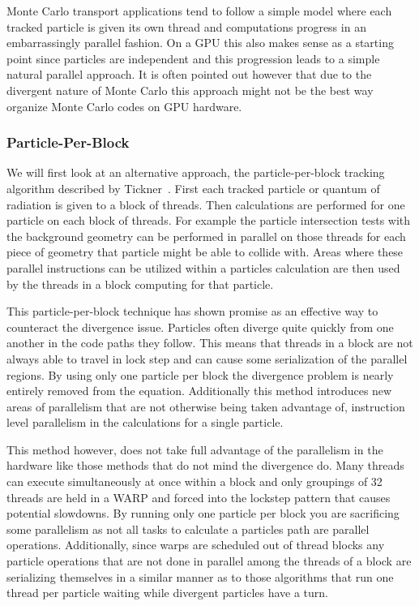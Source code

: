 %
Monte Carlo transport applications tend to follow a simple model where each tracked particle is given its own thread and computations progress in an embarrassingly parallel fashion. 
%
On a GPU this also makes sense as a starting point since particles are independent and this progression leads to a simple natural parallel approach.
%
It is often pointed out however that due to the divergent nature of Monte Carlo this approach might not be the best way organize Monte Carlo codes on GPU hardware.
%

\subsubsection*{\textbf{Particle-Per-Block}}
We will first look at an alternative approach, the particle-per-block tracking algorithm described by Tickner~\cite{tickner2010monte}.
%
First each tracked particle or quantum of radiation is given to a block of threads.
%
Then calculations are performed for one particle on each block of threads.
%
For example the particle intersection tests with the background geometry can be performed in parallel on those threads for each piece of geometry that particle might be able to collide with.
%
Areas where these parallel instructions can be utilized within a particles calculation are then used by the threads in a block computing for that particle.
%

This particle-per-block technique has shown promise as an effective way to counteract the divergence issue.
%
Particles often diverge quite quickly from one another in the code paths they follow.
%
This means that threads in a block are not always able to travel in lock step and can cause some serialization of the parallel regions.
%
By using only one particle per block the divergence problem is nearly entirely removed from the equation.
%
Additionally this method introduces new areas of parallelism that are not otherwise being taken advantage of, instruction level parallelism in the calculations for a single particle.
%

%
This method however, does not take full advantage of the parallelism in the hardware like those methods that do not mind the divergence do.
%
Many threads can execute simultaneously at once within a block and only groupings of 32 threads are held in a WARP and forced into the lockstep pattern that causes potential slowdowns.
%
By running only one particle per block you are sacrificing some parallelism as not all tasks to calculate a particles path are parallel operations.
%
Additionally, since warps are scheduled out of thread blocks any particle operations that are not done in parallel among the threads of a block are serializing themselves in a similar manner as to those algorithms that run one thread per particle waiting while divergent particles have a turn.
%

